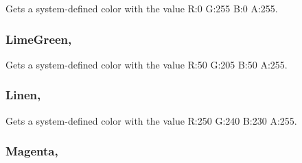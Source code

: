 Gets a system-\/defined color with the value R\+:0 G\+:255 B\+:0 A\+:255.

\hypertarget{structMicrosoft_1_1Xna_1_1Framework_1_1Color_afdab54a255b406dff26d54b848967986}{}
\subsubsection[{Lime\+Green}]{ Lime\+Green\hspace{0.3cm}{\ttfamily [static]}, {\ttfamily [get]}}\label{structMicrosoft_1_1Xna_1_1Framework_1_1Color_afdab54a255b406dff26d54b848967986}


Gets a system-\/defined color with the value R\+:50 G\+:205 B\+:50 A\+:255.

\hypertarget{structMicrosoft_1_1Xna_1_1Framework_1_1Color_af559c4940b4b1a3e96ef1c48bfbd3f69}{}
\subsubsection[{Linen}]{ Linen\hspace{0.3cm}{\ttfamily [static]}, {\ttfamily [get]}}\label{structMicrosoft_1_1Xna_1_1Framework_1_1Color_af559c4940b4b1a3e96ef1c48bfbd3f69}


Gets a system-\/defined color with the value R\+:250 G\+:240 B\+:230 A\+:255.

\hypertarget{structMicrosoft_1_1Xna_1_1Framework_1_1Color_a6524b76acd2596d1e2472551b34afe4e}{}
\subsubsection[{Magenta}]{ Magenta\hspace{0.3cm}{\ttfamily [static]}, {\ttfamily [get]}}\label{structMicrosoft_1_1Xna_1_1Framework_1_1Color_a6524b76acd2596d1e2472551b34afe4e}


